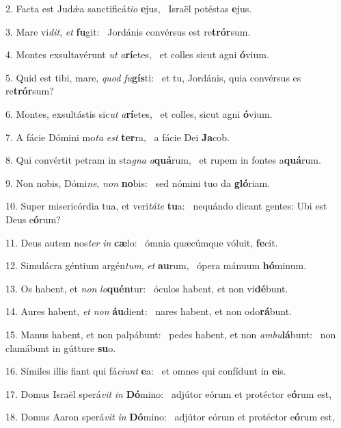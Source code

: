 2. Facta est Judǽa sanctificá\textit{ti}\textit{o} \textbf{e}jus, \ast\  Israël potéstas \textbf{e}jus.\

3. Mare vi\textit{dit}, \textit{et} \textbf{fu}git: \ast\  Jordánis convérsus est re\textbf{trór}sum.\

4. Montes exsultavérunt \textit{ut} \textit{a}\textbf{rí}etes, \ast\  et colles sicut agni \textbf{ó}vium.\

5. Quid est tibi, mare, \textit{quod} \textit{fu}\textbf{gís}ti: \ast\  et tu, Jordánis, quia convérsus es re\textbf{trór}sum?\

6. Montes, exsultástis sic\textit{ut} \textit{a}\textbf{rí}etes, \ast\  et colles, sicut agni \textbf{ó}vium.\

7. A fácie Dómini mo\textit{ta} \textit{est} \textbf{ter}ra, \ast\  a fácie Dei \textbf{Ja}cob.\

8. Qui convértit petram in sta\textit{gna} \textit{a}\textbf{quá}rum, \ast\  et rupem in fontes a\textbf{quá}rum.\

9. Non nobis, Dómi\textit{ne}, \textit{non} \textbf{no}bis: \ast\  sed nómini tuo da \textbf{gló}riam.\

10. Super misericórdia tua, et veri\textit{tá}\textit{te} \textbf{tu}a: \ast\  nequándo dicant gentes: Ubi est Deus e\textbf{ó}rum?\

11. Deus autem nos\textit{ter} \textit{in} \textbf{cæ}lo: \ast\  ómnia quæcúmque vóluit, \textbf{fe}cit.\

12. Simulácra géntium argén\textit{tum}, \textit{et} \textbf{au}rum, \ast\  ópera mánuum \textbf{hó}minum.\

13. Os habent, et \textit{non} \textit{lo}\textbf{quén}tur: \ast\  óculos habent, et non vi\textbf{dé}bunt.\

14. Aures habent, \textit{et} \textit{non} \textbf{áu}dient: \ast\  nares habent, et non odo\textbf{rá}bunt.\

15. Manus habent, et non palpábunt: \dag\  pedes habent, et non \textit{am}\textit{bu}\textbf{lá}bunt: \ast\  non clamábunt in gútture \textbf{su}o.\

16. Símiles illis fiant qui fá\textit{ci}\textit{unt} \textbf{e}a: \ast\  et omnes qui confídunt in \textbf{e}is.\

17. Domus Israël sperá\textit{vit} \textit{in} \textbf{Dó}mino: \ast\  adjútor eórum et protéctor e\textbf{ó}rum est,\

18. Domus Aaron sperá\textit{vit} \textit{in} \textbf{Dó}mino: \ast\  adjútor eórum et protéctor e\textbf{ó}rum est,\

